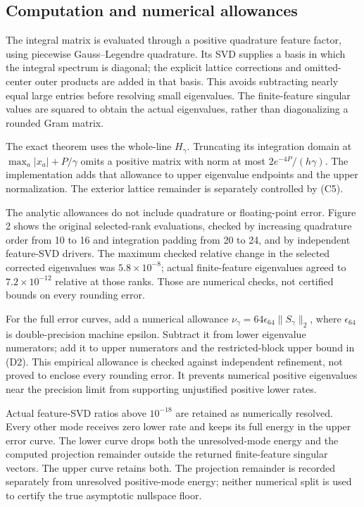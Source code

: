 \documentclass[11pt]{article}
\begin{document}
\subsection{Computation and numerical allowances}

The integral matrix is evaluated through a positive quadrature feature factor, using piecewise Gauss--Legendre quadrature. Its SVD supplies a basis in which the integral spectrum is diagonal; the explicit lattice corrections and omitted-center outer products are added in that basis. This avoids subtracting nearly equal large entries before resolving small eigenvalues. The finite-feature singular values are squared to obtain the actual eigenvalues, rather than diagonalizing a rounded Gram matrix.

The exact theorem uses the whole-line \(H_\gamma\). Truncating its integration domain at \(\max_a|x_a|+P/\gamma\) omits a positive matrix with norm at most \(2e^{-4P}/(h\gamma)\). The implementation adds that allowance to upper eigenvalue endpoints and the upper normalization. The exterior lattice remainder is separately controlled by (C5).

The analytic allowances do not include quadrature or floating-point error. Figure 2 shows the original selected-rank evaluations, checked by increasing quadrature order from 10 to 16 and integration padding from 20 to 24, and by independent feature-SVD drivers. The maximum checked relative change in the selected corrected eigenvalues was \(5.8\times10^{-8}\); actual finite-feature eigenvalues agreed to \(7.2\times10^{-12}\) relative at those ranks. Those are numerical checks, not certified bounds on every rounding error.

For the full error curves, add a numerical allowance \(\nu_\gamma=64\epsilon_{64}\|S_\gamma\|_2\), where \(\epsilon_{64}\) is double-precision machine epsilon. Subtract it from lower eigenvalue numerators; add it to upper numerators and the restricted-block upper bound in (D2). This empirical allowance is checked against independent refinement, not proved to enclose every rounding error. It prevents numerical positive eigenvalues near the precision limit from supporting unjustified positive lower rates.

Actual feature-SVD ratios above \(10^{-18}\) are retained as numerically resolved. Every other mode receives zero lower rate and keeps its full energy in the upper error curve. The lower curve drops both the unresolved-mode energy and the computed projection remainder outside the returned finite-feature singular vectors. The upper curve retains both. The projection remainder is recorded separately from unresolved positive-mode energy; neither numerical split is used to certify the true asymptotic nullspace floor.
\end{document}
